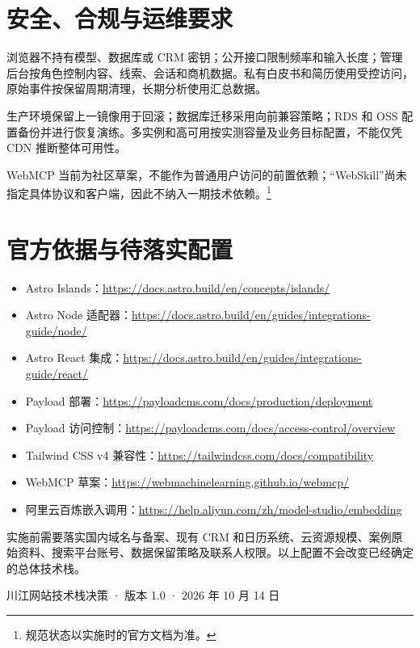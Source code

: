\documentclass[UTF8,zihao=-4,a4paper]{ctexart}
\newcommand{\urltext}[1]{\href{#1}{\small\url{#1}}}
\begin{document}
\section{安全、合规与运维要求}

浏览器不持有模型、数据库或 CRM 密钥；公开接口限制频率和输入长度；管理后台按角色控制内容、线索、会话和商机数据。私有白皮书和简历使用受控访问，原始事件按保留周期清理，长期分析使用汇总数据。

生产环境保留上一镜像用于回滚；数据库迁移采用向前兼容策略；RDS 和 OSS 配置备份并进行恢复演练。多实例和高可用按实测容量及业务目标配置，不能仅凭 CDN 推断整体可用性。

WebMCP 当前为社区草案，不能作为普通用户访问的前置依赖；“WebSkill”尚未指定具体协议和客户端，因此不纳入一期技术依赖。\footnote{规范状态以实施时的官方文档为准。}

\section{官方依据与待落实配置}

\begin{itemize}
  \item Astro Islands：\urltext{https://docs.astro.build/en/concepts/islands/}
  \item Astro Node 适配器：\urltext{https://docs.astro.build/en/guides/integrations-guide/node/}
  \item Astro React 集成：\urltext{https://docs.astro.build/en/guides/integrations-guide/react/}
  \item Payload 部署：\urltext{https://payloadcms.com/docs/production/deployment}
  \item Payload 访问控制：\urltext{https://payloadcms.com/docs/access-control/overview}
  \item Tailwind CSS v4 兼容性：\urltext{https://tailwindcss.com/docs/compatibility}
  \item WebMCP 草案：\urltext{https://webmachinelearning.github.io/webmcp/}
  \item 阿里云百炼嵌入调用：\urltext{https://help.aliyun.com/zh/model-studio/embedding}
\end{itemize}

实施前需要落实国内域名与备案、现有 CRM 和日历系统、云资源规模、案例原始资料、搜索平台账号、数据保留策略及联系人权限。以上配置不会改变已经确定的总体技术栈。

\vfill
\begin{center}
\color{muted}\small 川江网站技术栈决策 · 版本 1.0 · 2026 年 10 月 14 日
\end{center}
\end{document}
